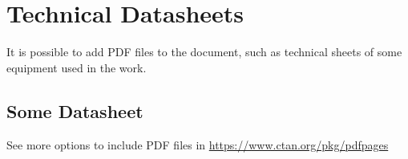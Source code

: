 
\chapter{Technical Datasheets}
\label{chapter:appendixDatasheets}

It is possible to add PDF files to the document, such as technical sheets of some equipment used in the work.

\section{Some Datasheet}
\label{section:datasheet}

See more options to include PDF files in \url{https://www.ctan.org/pkg/pdfpages}

%

